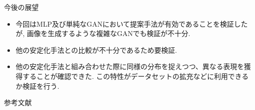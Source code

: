 \documentclass[dvipdfmx,12pt,unicode]{beamer}
\begin{document}
\begin{frame}{今後の展望}
  \begin{itemize}
  \item 今回はMLP及び単純なGANにおいて提案手法が有効であることを検証したが, 画像を生成するような複雑なGANでも検証が不十分.
  \item 他の安定化手法との比較が不十分であるため要検証.
  \item 他の安定化手法と組み合わせた際に同様の分布を捉えつつ、異なる表現を獲得することが確認できた.
    この特性がデータセットの拡充などに利用できるか検証を行う.
  \end{itemize}
\end{frame}

\begin{frame}[allowframebreaks]{参考文献}
  \beamertemplatetextbibitems


\end{frame}
\end{document}
